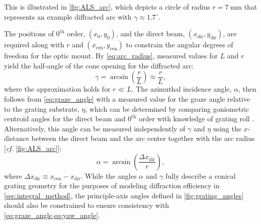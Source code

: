 This is illustrated in \cref{fig:ALS_arc}, which depicts a circle of radius $r = \SI{7}{\mm}$ that represents an example diffracted arc with $\gamma \approx 1.7^{\circ}$. 

The positions of $0^{\text{th}}$ order, $(x_0,y_0)$, and the direct beam, $(x_{\text{dir}},y_{\text{dir}})$, are required along with $r$ and $(x_{\text{cen}},y_{\text{cen}})$ to constrain the angular degrees of freedom for the optic mount. 
By \cref{eq:arc_radius}, measured values for $L$ and $r$ yield the half-angle of the cone opening for the diffracted arc:
\begin{equation}\label{eq:measure_gamma}
 \gamma = \arcsin \left( \frac{r}{L} \right) \approx \frac{r}{L} , %
 \end{equation}
where the approximation holds for $r \ll L$. 
The azimuthal incidence angle, $\alpha$, then follows from \cref{eq:graze_angle} with a measured value for the graze angle relative to the grating substrate, $\eta$, which can be determined by comparing goniometric centroid angles for the direct beam and $0^{\text{th}}$ order with knowledge of grating roll \cite{Miles18}. 
Alternatively, this angle can be measured independently of $\gamma$ and $\eta$ using the $x$-distance between the direct beam and the arc center together with the arc radius [\emph{cf.\@} \cref{fig:ALS_arc}]:
\begin{equation}\label{eq:measure_alpha}
 \alpha = \arcsin \left( \frac{\Delta x_{\text{dir}}}{r} \right) ,
 \end{equation}
where $\Delta x_{\text{dir}} \equiv x_{\text{cen}} - x_{\text{dir}}$. 
While the angles $\alpha$ and $\gamma$ fully describe a conical grating geometry for the purposes of modeling diffraction efficiency in \cref{sec:integral_method}, the principle-axis angles defined in \cref{fig:grating_angles} should also be constrained to ensure consistency with \cref{eq:graze_angle,eq:yaw_angle}. 

